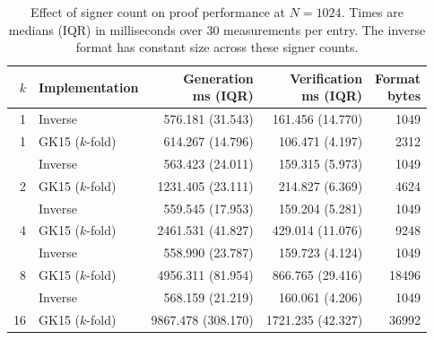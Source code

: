 \begin{table}[htbp]
\centering
\caption{Effect of signer count on proof performance at $N=1024$. Times are medians (IQR) in milliseconds over 30 measurements per entry. The inverse format has constant size across these signer counts.}
\label{tab:evaluation-signer-count}
\small
\setlength{\tabcolsep}{4pt}
\begin{tabular}{r l r r r}
\toprule
$k$ & Implementation & \shortstack{Generation\\ms (IQR)} & \shortstack{Verification\\ms (IQR)} & \shortstack{Format\\bytes} \\
\midrule
1 & Inverse & 576.181 (31.543) & 161.456 (14.770) & 1049 \\
1 & GK15 ($k$-fold) & 614.267 (14.796) & 106.471 (4.197) & 2312 \\
\addlinespace
2 & Inverse & 563.423 (24.011) & 159.315 (5.973) & 1049 \\
2 & GK15 ($k$-fold) & 1231.405 (23.111) & 214.827 (6.369) & 4624 \\
\addlinespace
4 & Inverse & 559.545 (17.953) & 159.204 (5.281) & 1049 \\
4 & GK15 ($k$-fold) & 2461.531 (41.827) & 429.014 (11.076) & 9248 \\
\addlinespace
8 & Inverse & 558.990 (23.787) & 159.723 (4.124) & 1049 \\
8 & GK15 ($k$-fold) & 4956.311 (81.954) & 866.765 (29.416) & 18496 \\
\addlinespace
16 & Inverse & 568.159 (21.219) & 160.061 (4.206) & 1049 \\
16 & GK15 ($k$-fold) & 9867.478 (308.170) & 1721.235 (42.327) & 36992 \\
\bottomrule
\end{tabular}
\end{table}
